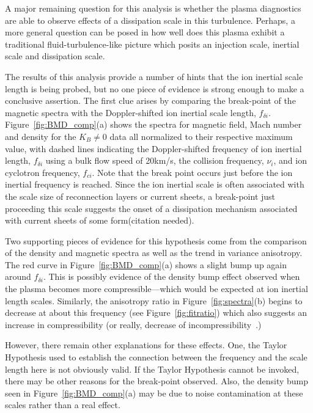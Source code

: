 \documentclass[aip,prl,amsmath,amssymb,reprint,superscriptaddress]{revtex4-1} %
\begin{document}
A major remaining question for this analysis is whether the plasma diagnostics are able to observe effects of a dissipation scale in this turbulence. Perhaps, a more general question can be posed in how well does this plasma exhibit a traditional fluid-turbulence-like picture which posits an injection scale, inertial scale and dissipation scale.

The results of this analysis provide a number of hints that the ion inertial scale length is being probed, but no one piece of evidence is strong enough to make a conclusive assertion. The first clue arises by comparing the break-point of the magnetic spectra with the Doppler-shifted ion inertial scale length, $f_{\delta i}$. Figure~\ref{fig:BMD_comp}(a) shows the spectra for magnetic field, Mach number and density for the $K_{B}\neq 0$ data all normalized to their respective maximum value, with dashed lines indicating the Doppler-shifted frequency of ion inertial length, $f_{\delta i}$ using a bulk flow speed of 20km/s, the collision frequency, $\nu_{i}$, and ion cyclotron frequency, $f_{ci}$. Note that the break point occurs just before the ion inertial frequency is reached. Since the ion inertial scale is often associated with the scale size of reconnection layers or current sheets, a break-point just proceeding this scale suggests the onset of a dissipation mechanism associated with current sheets of some form(citation needed).

Two supporting pieces of evidence for this hypothesis come from the comparison of the density and magnetic spectra as well as the trend in variance anisotropy. The red curve in Figure~\ref{fig:BMD_comp}(a) shows a slight bump up again around $f_{\delta i}$. This is possibly evidence of the density bump effect observed when the plasma becomes more compressible---which would be expected at ion inertial length scales. Similarly, the anisotropy ratio in Figure~\ref{fig:spectra}(b) begins to decrease at about this frequency (see Figure~\ref{fig:fitratio}) which also suggests an increase in compressibility (or really, decrease of incompressibility~\cite{kiyani13}.)

However, there remain other explanations for these effects. One, the Taylor Hypothesis used to establish the connection between the frequency and the scale length here is not obviously valid. If the Taylor Hypothesis cannot be invoked, there may be other reasons for the break-point observed. Also, the density bump seen in Figure~\ref{fig:BMD_comp}(a) may be due to noise contamination at these scales rather than a real effect.
\end{document}
